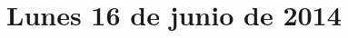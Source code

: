 \documentclass[12pt,spanish]{article}
\begin{document}
  \thispagestyle{empty}
  \pagestyle{empty}
  \section*{Lunes 16 de junio de 2014}

  
\end{document}
